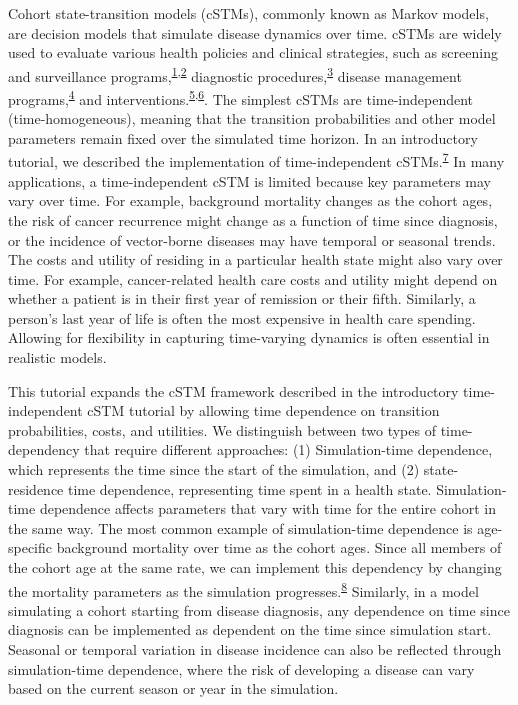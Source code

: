 \documentclass[
]{article}
\begin{document}
Cohort state-transition models (cSTMs), commonly known as Markov models, are decision models that simulate disease dynamics over time. cSTMs are widely used to evaluate various health policies and clinical strategies, such as screening and surveillance programs,\textsuperscript{\protect\hyperlink{ref-Suijkerbuijk2018}{1},\protect\hyperlink{ref-Sathianathen2018a}{2}} diagnostic procedures,\textsuperscript{\protect\hyperlink{ref-Lu2018b}{3}} disease management programs,\textsuperscript{\protect\hyperlink{ref-Djatche2018}{4}} and interventions.\textsuperscript{\protect\hyperlink{ref-Pershing2014}{5},\protect\hyperlink{ref-Smith-Spangler2010}{6}}. The simplest cSTMs are time-independent (time-homogeneous), meaning that the transition probabilities and other model parameters remain fixed over the simulated time horizon. In an introductory tutorial, we described the implementation of time-independent cSTMs.\textsuperscript{\protect\hyperlink{ref-Alarid-Escudero2021a}{7}} In many applications, a time-independent cSTM is limited because key parameters may vary over time. For example, background mortality changes as the cohort ages, the risk of cancer recurrence might change as a function of time since diagnosis, or the incidence of vector-borne diseases may have temporal or seasonal trends. The costs and utility of residing in a particular health state might also vary over time. For example, cancer-related health care costs and utility might depend on whether a patient is in their first year of remission or their fifth. Similarly, a person's last year of life is often the most expensive in health care spending. Allowing for flexibility in capturing time-varying dynamics is often essential in realistic models.

This tutorial expands the cSTM framework described in the introductory time-independent cSTM tutorial by allowing time dependence on transition probabilities, costs, and utilities. We distinguish between two types of time-dependency that require different approaches: (1) Simulation-time dependence, which represents the time since the start of the simulation, and (2) state-residence time dependence, representing time spent in a health state. Simulation-time dependence affects parameters that vary with time for the entire cohort in the same way. The most common example of simulation-time dependence is age-specific background mortality over time as the cohort ages. Since all members of the cohort age at the same rate, we can implement this dependency by changing the mortality parameters as the simulation progresses.\textsuperscript{\protect\hyperlink{ref-Snowsill2019}{8}} Similarly, in a model simulating a cohort starting from disease diagnosis, any dependence on time since diagnosis can be implemented as dependent on the time since simulation start. Seasonal or temporal variation in disease incidence can also be reflected through simulation-time dependence, where the risk of developing a disease can vary based on the current season or year in the simulation.
\end{document}

